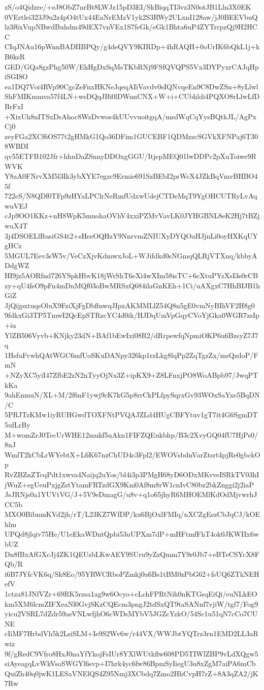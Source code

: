 zS/o4Qidzre/+eJ8ObZ7nrBt8LWJz15pD3EI/SkBiqqTI3vz3N0otJB1Lln3X0EK
0VErtlei323J9u2z4pO4tUx44EaNrEMzV1yk2S3RWy2ULxnI128aw/jJ0BEEVbuQ
lz3f6xVupNBwdBuhdm49dEX7vnVEx1S7feGk/eGk1Bhta6uP4ZYTrrpzQj9H2HCC
CIqJNAu16pWnnBADIIBPQy/g4deQVY9KIRDp+4hRAQH+0oUrIK6bQkL1j+kB6ksR
GED/GQa8gzPhg50W/EhHgDxSqMsTKbRNj9FSfQVQPS5Vx3DYPyxrCAJqHpiSGI8O
ea1DQ7Voi4RVp90CgcZeFnxHKNeJqeqAIiVavdv0sIQNvqeEn9C8DwZSn+8yLlwl
ShFMIKmmva57f4LN+wsDQqJBi0lDWunCNX+W+i+CUbhldi4PQXO8rLlwLfDBrFxI
+XixUh8nITSxDsAhoc8WzDvwos4kUUvvuoitgqA/msdWqCqYysBQtkJL/AgPxCj0
zeyFGa2XCf6OS77t2gHMkG1Qo36DFim1GUCEBF1QDMzzcSGVkXFNPaj6T308WBDI
qv55ETFB102Jfr+hhnDaZSnnyDDOxgGGU/ItjepMEQ01lwDDPc2pXuToiwe9RWVK
Y8aA0FNrvXM5l3Ik3ybXYE7egzc9Ermie691SzBEbI2prWcX4JZkBqVmvBHBO45f
722eS/N8QDf0TFp9zHYaLPClrNeRmfUdxwUdejCTDeMqT9YgOHCUTRyLvAqwuVEJ
cJp9OO1KKz+nH8WpK5muohaOVhV4xxiPZMvVavLK0JYHGBNL8eK2Hj7tBZjwuX4T
3j4DSOELlRusiGS4t2+sHeeOQHzY9NnrvmZNIUXyDYQOaHJjnLi0oyHXKqUYgHCz
5MGUL7Eev3sW5v/VeCzXjvKdmwxJoL+WJifdkd0sNGmqQLRjVTXnq/kbbyADdgWZ
HI9jz5AORfnd726YSpkHbvK18jWrShT6eXi4wXIm58isTC+6cXtuPYzXsI3s0rCB
zy+qU4fsO9pFn4mDnMQf03oBwMRSxQ684ilaGnKEh+1Ci/uAXgxC7HhBIJB1hGiZ
JjQijpxtuqsOluX9FziXjFgDbflnwqJIpxAKMMLlZ54Q8n5gE0vmNyBIhVF2H8g0
9fdkxGi3TP5TmwI2QcEpSTRzcYC4d0ik/HJDqUmVpGqyCVoYjGka0WGR7zsIp+iu
YlZB506Vyvb+KNjky23dN+BAf1bEwIxi08R2/dRrpewfqNpmiOKP6u6BzsyZ7J7q
1HsfuFvwhQAtWGC6mfUoSKuDANpy326kp1rzLkg8lqPp2ZqTgzZx/msQzdoP/FmN
+NZyXC5yiI47ZfbE2zN2nTyyOjNx3Z+ipKX9+Z8LFnxjPO8WoABpb97/JwqPTkKa
9ahEnmuN/XL+M/2f6nF1ywj9cK7kG5p8rrCkPLfpySqrxGv93WOxSaYxe5BqDN/C
5PRJTzKMw1iyRUHGwdTOXFNtPVQAJZLd4HUgCBFYtuv1gT7it4G6SgmDT5ufLrBy
M+womZrJ0TecUrWHE12mukf5uAkn1FIFZQEukbhp/B3c2XvyGQ04fU7HjPs0/8nJ
WmlT2kCbLrWYebtX+L6K67nzChUD4c3Fpl2/EWOVsbdnVarZtsrt4pjRe0gbckOp
RvZBZnZTcqPdt1xwva4Naijq2uYos/bl4i3p3PMgH68yD6ODxMKvveISRkTV03hI
jWuZ+egUeuPxjgZstYtamFRTzdGX9Kni0Af8m8rW1cnIvC80bz2bkZnggi2j2iaP
JsJRNjs0a1YUVtVG/J+5V9eDmagG/u8v+q1o65jhyR6MHOEMlKdOdMjvwrhJCC5b
MXO0BibnmKVd2jh/rT/L23KZ7WfDP/ku6BjOxlFMIq/nXCZgEszCbJqCJ/kOEhlm
UPQd8jlqiv75He/U1eEkaWDntQpbi53uUPXm7dP+mHFtmfFhT4ok0JKWIIx6wbUZ
Dn8fBxAfGXcJj4ZK1QEUsbLKwAEY9SUru9yZzQmm7Y9r0Jb7+eBTeCSYcX8FQb/R
i6B7JYfcVK6q/Sk8Eo/95YRWCRboPZmkj0a6Bs1tBM0zPbG62+fsUQ6ZTkNEHefV
1ctza81JNfVZr+69RK5rzsa1ag9w6Ocyo+cLchFPRtNih0nKTGsqEiQi/euNLkEO
km5XM6lcmZIFXeaNl0GvjSKzCQEcm3pngJ2tdSxQT9taSANnf7vjiW/tgf7/Fog9
yicu2VSRL7dZdr59aeVNLwfjhO6cWDsMYbV5JGZcYzkO/54Sc1u51qN7cCo7CUNE
cIiMF7HrbdVh5k2LsiSLM+Ie9S2Wv6w/r44VX/WWJbtYQTrz3rn1EMD2LL3aRwiz
9f/gRedC9Vfro8HxJ0naYfYkojFsIUr8YXlWUtkflw608PD5TIWlZBP9vLdXQgw5
siAyeagqLvWkVsoSWGYl6svp+I7hrk4yc6fw86BpmSyIiegU3u8xZgM7aiPA6mCb
QuiZh40q0jwK1LESaVNElQS4Z95Nmj3XCbdq7Zmo2HhCvpH7rZ+8A3qZA2/jK7Rw
